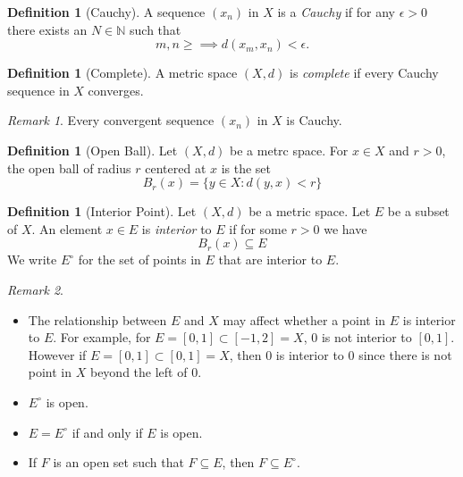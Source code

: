 \documentclass[12pt, lettersize]{book}
\theoremstyle{plain}
\theoremstyle{definition}
\newtheorem{dfn}[thm]{Definition}
\theoremstyle{remark}
\newtheorem*{rem}{Remark}
\newcommand{\N}{\mathbb{N}}
\begin{document}
		\begin{dfn}[Cauchy]
		A sequence $(x_n)$ in $X$ is a \emph{Cauchy} if for any $\epsilon>0$ there exists an $N\in\N$ such that
		\begin{displaymath}
			m,n\geq\implies d(x_m,x_n)<\epsilon.
		\end{displaymath}
		\end{dfn}
		
		\begin{dfn}[Complete]
		A metric space $(X,d)$ is \emph{complete} if every Cauchy sequence in $X$ converges.
		\end{dfn}
		\begin{rem}
		Every convergent sequence $(x_n)$ in $X$ is Cauchy.
		\end{rem}
		
		\begin{dfn}[Open Ball]
			Let $(X,d)$ be a metrc space. For $x\in X$ and $r>0$, the open ball of radius $r$ centered at $x$ is the set
			\begin{displaymath}
				B_r(x)=\{y\in X: d(y,x)<r\}
			\end{displaymath}
		\end{dfn}
	
		\begin{dfn}[Interior Point]
			Let $(X,d)$ be a metric space. Let $E$ be a subset of $X$. An element $x\in E$ is \emph{interior} to $E$ if for some $r>0$ we have
			\begin{displaymath}
				B_r(x)\subseteq E
			\end{displaymath}
			We write $E^\circ$ for the set of points in $E$ that are interior to $E$.
		\end{dfn}
		\begin{rem}
		\begin{itemize}
			\item The relationship between $E$ and $X$ may affect whether a point in $E$ is interior to $E$. For example, for $E=[0,1]\subset[-1,2]=X$, $0$ is not interior to $[0,1]$. However if $E=[0,1]\subset[0,1]=X$, then $0$ is interior to $0$ since there is not point in $X$ beyond the left of $0$.
			\item $E^\circ$ is open.
			\item $E=E^\circ$ if and only if $E$ is open.
			\item If $F$ is an open set such that $F\subseteq E$, then $F\subseteq E^\circ$.
		\end{itemize}		
		\end{rem}
		
\end{document}
